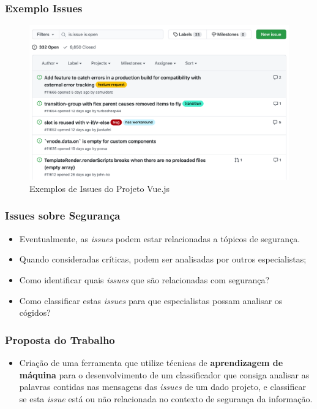 \begin{frame}
  \frametitle{Exemplo Issues}
  \begin{figure}[htbp]
    \includegraphics[width=\textwidth]{../report/images/issues_example.png}
    \caption{Exemplos de Issues do Projeto Vue.js}
  \end{figure}
\end{frame}

\begin{frame}
  \frametitle{Issues sobre Segurança}
  \begin{itemize}
    \item Eventualmente, as \textit{issues} podem estar relacionadas a tópicos de segurança.
    \item Quando consideradas críticas, podem ser analisadas por outros especialistas;
    \item Como identificar quais \textit{issues} que são relacionadas com segurança?
    \item Como classificar estas \textit{issues} para que especialistas possam analisar os cógidos?
  \end{itemize}
\end{frame}

\begin{frame}
  \frametitle{Proposta do Trabalho}
  \begin{itemize}
    \item Criação de uma ferramenta que utilize técnicas de \textbf{aprendizagem de máquina} para o desenvolvimento de um classificador que consiga analisar as palavras contidas nas mensagens das \textit{issues} de um dado projeto, e classificar se esta \textit{issue} está ou não relacionada no contexto de segurança da informação.
  \end{itemize}
\end{frame}